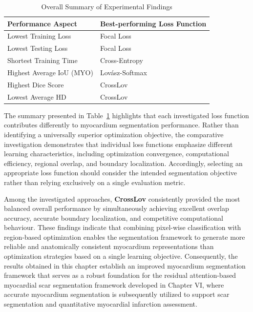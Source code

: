\begin{table}[htbp]
	\centering
	\caption{Overall Summary of Experimental Findings}
	\label{tab:ch5-overall-summary}
	
	\small
	\setlength{\heavyrulewidth}{\lightrulewidth}
	\renewcommand{\arraystretch}{1.3}
	
	\begin{tabular}{ll}
		\toprule
		\textbf{Performance Aspect} & \textbf{Best-performing Loss Function} \\ \midrule
		Lowest Training Loss       & Focal Loss \\
		Lowest Testing Loss        & Focal Loss \\
		Shortest Training Time     & Cross-Entropy \\
		Highest Average IoU (MYO)  & Lov\'asz-Softmax \\
		Highest Dice Score         & CrossLov \\
		Lowest Average HD          & CrossLov \\ \bottomrule
	\end{tabular}
\end{table}

The summary presented in Table~\ref{tab:ch5-overall-summary} highlights that each investigated loss function contributes differently to myocardium segmentation performance. Rather than identifying a universally superior optimization objective, the comparative investigation demonstrates that individual loss functions emphasize different learning characteristics, including optimization convergence, computational efficiency, regional overlap, and boundary localization. Accordingly, selecting an appropriate loss function should consider the intended segmentation objective rather than relying exclusively on a single evaluation metric.

Among the investigated approaches, \textbf{CrossLov} consistently provided the most balanced overall performance by simultaneously achieving excellent overlap accuracy, accurate boundary localization, and competitive computational behaviour. These findings indicate that combining pixel-wise classification with region-based optimization enables the segmentation framework to generate more reliable and anatomically consistent myocardium representations than optimization strategies based on a single learning objective. Consequently, the results obtained in this chapter establish an improved myocardium segmentation framework that serves as a robust foundation for the residual attention-based myocardial scar segmentation framework developed in Chapter VI, where accurate myocardium segmentation is subsequently utilized to support scar segmentation and quantitative myocardial infarction assessment.


